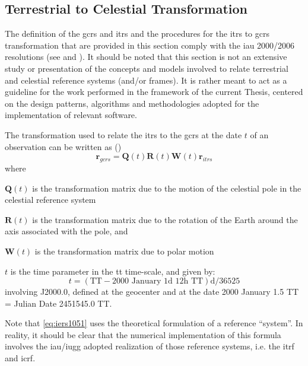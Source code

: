 \subsection{Terrestrial to Celestial Transformation}\label{ssec:itrs-to-gcrs}

The definition of the \gls{gcrs} and \gls{itrs} and the procedures for the \gls{itrs} 
to \gls{gcrs} transformation that are provided in this section comply with the 
\gls{iau} 2000/2006 resolutions (see \cite{Capitaine2006} and \cite{iauWGnfa}). 
It should be noted that this section is not an extensive study or presentation 
of the concepts and models involved to relate terrestrial and celestial reference 
systems (and/or frames). It is rather meant to act as a guideline for the work 
performed in the framework of the current Thesis, centered on the design patterns, 
algorithms and methodologies adopted for the implementation of relevant software.

The transformation used to relate the \gls{itrs} to the \gls{gcrs} at the date $t$ 
of an observation can be written as (\cite{iers2010})
\begin{equation}\label{eq:iers1051}
    \bm{r}_{gcrs} = \bm{Q}(t) \bm{R}(t) \bm{W}(t) \bm{r}_{itrs}
\end{equation}
where
\begin{description}
    \item $\bm{Q}(t)$ is the transformation matrix due to the motion of 
        the celestial pole in the celestial reference system 
    \item $\bm{R}(t)$ is the transformation matrix due to the rotation 
        of the Earth around the axis associated with the pole, and
    \item $\bm{W}(t)$ is the transformation matrix due to polar motion
    \item $t$ is the time parameter in the \gls{tt} time-scale, and given by:
    \begin{equation}
        t = (\text{TT} - \text{2000 January 1d 12h TT}) \si{\day} / 36525
    \end{equation}
    involving J2000.0, defined at the geocenter and at the date 2000 January 1.5 TT 
    = Julian Date 2451545.0 TT.
\end{description}
Note that \autoref{eq:iers1051} uses the theoretical formulation of a reference ``system''. 
In reality, it should be clear that the numerical implementation of this formula 
involves the \gls{iau}/\gls{iugg} adopted realization of those reference systems, i.e. 
the \gls{itrf} and \gls{icrf}.

